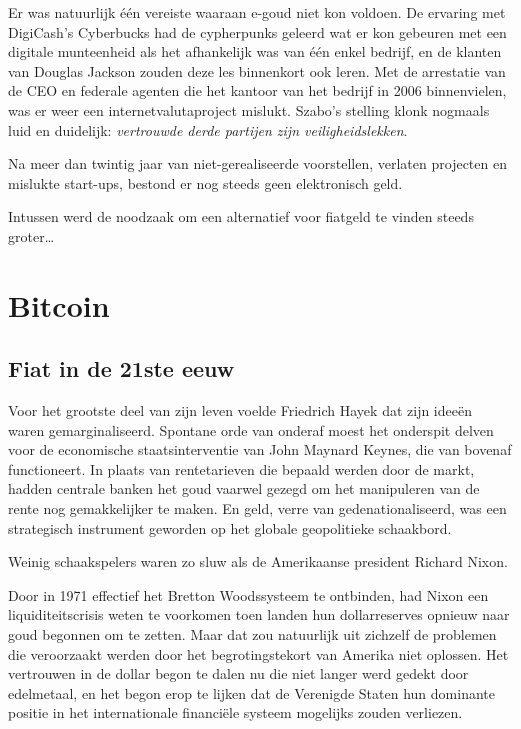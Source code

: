 \documentclass[smalldemyvopaper,11pt,twoside,onecolumn,openright,extrafontsizes,hidelinks]{memoir}
\begin{document}
Er was natuurlijk één vereiste waaraan e-goud niet kon voldoen. De
ervaring met DigiCash's Cyberbucks had de cypherpunks geleerd wat er kon
gebeuren met een digitale munteenheid als het afhankelijk was van één
enkel bedrijf, en de klanten van Douglas Jackson zouden deze les
binnenkort ook leren. Met de arrestatie van de CEO en federale agenten
die het kantoor van het bedrijf in 2006 binnenvielen, was er weer een
internetvalutaproject mislukt. Szabo's stelling klonk nogmaals luid en
duidelijk: \emph{vertrouwde derde partijen zijn veiligheidslekken}.

Na meer dan twintig jaar van niet-gerealiseerde voorstellen, verlaten
projecten en mislukte start-ups, bestond er nog steeds geen elektronisch
geld.

Intussen werd de noodzaak om een alternatief voor fiatgeld te vinden
steeds groter\ldots{}

\part{Bitcoin}

\chapter{Fiat in de 21ste eeuw}\label{fiat-in-de-21ste-eeuw}

Voor het grootste deel van zijn leven voelde Friedrich Hayek dat zijn
ideeën waren gemarginaliseerd. Spontane orde van onderaf moest het
onderspit delven voor de economische staatsinterventie van John Maynard
Keynes, die van bovenaf functioneert. In plaats van rentetarieven die
bepaald werden door de markt, hadden centrale banken het goud vaarwel
gezegd om het manipuleren van de rente nog gemakkelijker te maken. En
geld, verre van gedenationaliseerd, was een strategisch instrument
geworden op het globale geopolitieke schaakbord.

Weinig schaakspelers waren zo sluw als de Amerikaanse president Richard
Nixon.

Door in 1971 effectief het Bretton Woodssysteem te ontbinden, had Nixon
een liquiditeitscrisis weten te voorkomen toen landen hun dollarreserves
opnieuw naar goud begonnen om te zetten. Maar dat zou natuurlijk uit
zichzelf de problemen die veroorzaakt werden door het begrotingstekort
van Amerika niet oplossen. Het vertrouwen in de dollar begon te dalen nu
die niet langer werd gedekt door edelmetaal, en het begon erop te lijken
dat de Verenigde Staten hun dominante positie in het internationale
financiële systeem mogelijks zouden verliezen.
\end{document}
